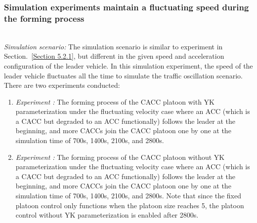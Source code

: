 \documentclass[journal]{IEEEtran}
\begin{document}
\subsubsection{Simulation experiments maintain a fluctuating speed during the forming process}
\label{Section 5.2.2}
~\\

\textit{Simulation scenario:} The simulation scenario is similar to experiment \uppercase\expandafter{} in Section.~\ref{Section 5.2.1}, but different in the given speed and acceleration configuration of the leader vehicle. In this simulation experiment, the speed of the leader vehicle fluctuates all the time to simulate the traffic oscillation scenario. There are two experiments conducted:
\begin{enumerate}
  \item \textit{Experiment \uppercase\expandafter{}:} The forming process of the CACC platoon with YK parameterization under the fluctuating velocity case where an ACC (which is a CACC but degraded to an ACC functionally) follows the leader at the beginning, and more CACCs join the CACC platoon one by one at the simulation time of 700s, 1400s, 2100s, and 2800s.
  \item \textit{Experiment \uppercase\expandafter{}:} The forming process of the CACC platoon without YK parameterization under the fluctuating velocity case where an ACC (which is a CACC but degraded to an ACC functionally) follows the leader at the beginning, and more CACCs join the CACC platoon one by one at the simulation time of 700s, 1400s, 2100s, and 2800s. Note that since the fixed platoon control only functions when the platoon size reaches 5, the platoon control without YK parameterization is enabled after 2800s.
\end{enumerate}
\end{document}
